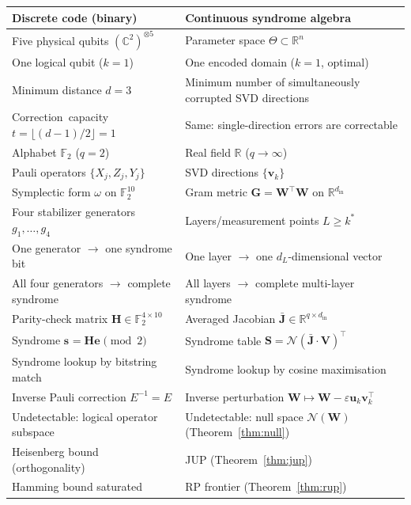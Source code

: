 \documentclass[11pt,a4paper]{article}
\theoremstyle{definition}
\newcommand{\Wm}{\mathbf{W}}
\newcommand{\Gm}{\mathbf{G}}
\newcommand{\Vm}{\mathbf{V}}
\newcommand{\Sm}{\mathbf{S}}
\newcommand{\Jm}{\mathbf{J}}
\newcommand{\Hm}{\mathbf{H}}
\newcommand{\vk}[1][]{\mathbf{v}_{#1}}
\newcommand{\uk}[1][]{\mathbf{u}_{#1}}
\newcommand{\sk}[1][]{\mathbf{s}_{#1}}
\newcommand{\ek}[1][]{\mathbf{e}_{#1}}
\newcommand{\Rbb}{\mathbb{R}}
\newcommand{\Fbb}{\mathbb{F}}
\newcommand{\Nop}{\mathcal{N}}
\newcommand{\dimin}{d_{\mathrm{in}}}
\newcommand{\Cnumber}{\mathbb{C}}
\begin{document}
\begin{center}
\renewcommand{\arraystretch}{1.35}
\begin{tabular}{p{6.0cm}p{6.4cm}}
\toprule
\textbf{Discrete code (binary)} &
\textbf{Continuous syndrome algebra} \\
\midrule
Five physical qubits $(\Cnumber^2)^{\otimes 5}$ &
Parameter space $\Theta\subset\Rbb^n$ \\

One logical qubit ($k = 1$) &
One encoded domain ($k = 1$, optimal) \\

Minimum distance $d = 3$ &
Minimum number of simultaneously corrupted SVD directions \\

\mbox{Correction capacity} \mbox{$t = \lfloor (d-1)/2\rfloor = 1$} &
Same: single-direction errors are correctable \\

Alphabet $\Fbb_2$ ($q = 2$) &
Real field $\Rbb$ ($q\to\infty$) \\

Pauli operators $\{X_j, Z_j, Y_j\}$ &
SVD directions $\{\vk[k]\}$ \\

Symplectic form $\omega$ on $\Fbb_2^{10}$ &
Gram metric $\Gm = \Wm^\top\Wm$ on $\Rbb^{\dimin}$ \\

Four stabilizer generators $g_1,\dots,g_4$ &
Layers/measurement points $L\geq k^*$ \\

One generator $\to$ one syndrome bit &
One layer $\to$ one $d_L$-dimensional vector \\

All four generators $\to$ complete syndrome &
All layers $\to$ complete multi-layer syndrome \\

Parity-check matrix $\Hm \in \Fbb_2^{4\times 10}$ &
Averaged Jacobian $\bar{\Jm} \in \Rbb^{q\times\dimin}$ \\

Syndrome $\sk = \Hm\ek \pmod 2$ &
Syndrome table $\Sm = \Nop(\bar{\Jm}\cdot\Vm)^\top$ \\

Syndrome lookup by bitstring match &
Syndrome lookup by cosine maximisation \\

Inverse Pauli correction $E^{-1} = E$ &
Inverse perturbation $\Wm \mapsto \Wm - \varepsilon\uk[k]\vk[k]^\top$ \\

Undetectable: logical operator subspace &
Undetectable: null space $\mathcal{N}(\Wm)$ (Theorem~\ref{thm:null}) \\

Heisenberg bound (orthogonality) &
JUP (Theorem~\ref{thm:jup}) \\

Hamming bound saturated &
RP frontier (Theorem~\ref{thm:rup}) \\

\bottomrule
\end{tabular}
\end{center}
\end{document}
